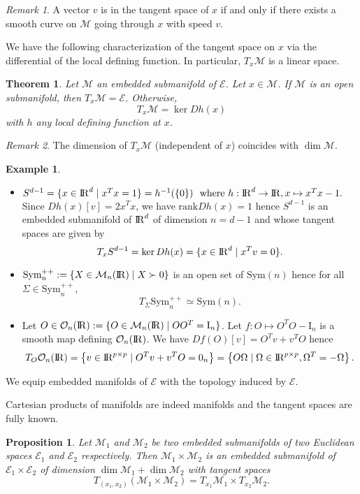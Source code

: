 \documentclass[10pt,a4paper]{book}
\theoremstyle{definition}
\newtheorem{exm}{Example}[section]
\theoremstyle{plain}
\newtheorem{thm}{Theorem}[section]
\newtheorem{prop}{Proposition}[section]
\theoremstyle{remark}
\newtheorem{rmk}{Remark}[section]
\newcommand{\E}{\mathcal{E}}
\newcommand \M {\mathcal{M}}
\def\R{{\rm I\kern-0.16em R}}
\begin{document}
\begin{rmk}
A vector $v$ is in the tangent space of $x$ if and only if there exists a smooth curve on $\mathcal{M}$ going through $x$ with speed $v$.
\end{rmk}
We have the following characterization of the tangent space on $x$ via the differential of the local defining function. In particular, $T_x\M$ is a linear space.
\begin{thm}
Let $\mathcal{M}$ an embedded submanifold of $\mathcal{E}$. Let $x\in \mathcal{M}$. If $\mathcal{M}$ is an open submanifold, then $T_x\mathcal{M}=\mathcal{E}$. Otherwise,
$$T_x\mathcal{M}=\ker Dh(x)$$
with $h$ any local defining function at $x$.
\end{thm}
\begin{rmk} The dimension of $T_x\mathcal{M}$ (independent of $x$) coincides with $\dim \mathcal{M}$.
\end{rmk}
\begin{exm}~
\begin{itemize}
\item $S^{d-1}=\{x\in \R^d\mid x^{T}x=1\}= h^{-1}(\{0\})~\text{ where }h:\R^d\to \R, x\mapsto x^{T}x-1.$
Since $Dh(x)[v]=2x^{T}x$, we have $\text{rank} Dh(x)=1$ hence $S^{d-1}$ is an embedded submanifold of $\R^d$ of dimension $n=d-1$ and whose tangent spaces are given by
$$T_xS^{d-1}=\ker Dh(x)=\{x\in \R^{d}\mid x^{T}v=0\}.$$
\item $\text{Sym}_n^{++}:=\{X\in \mathcal{M}_n(\R) \mid X \succ 0\}$ is an open set of $\text{Sym}(n)$ hence for all $\Sigma \in \text{Sym}_{n}^{++}$,
$$T_{\Sigma}\text{Sym}_n^{++}\simeq \text{Sym}(n).$$
\item Let $O \in \mathcal{O}_n(\R):=\{O \in \mathcal{M}_n(\R) \mid OO^{T}=\text{I}_n\}$. Let $f:O\mapsto O^TO -\text{I}_n$ is a smooth map defining $\mathcal{O}_n(\R)$. We have
$Df(O)[v]=O^Tv+v^{T}O$ hence
$$T_O\mathcal{O}_n(\R) =\left\{v\in \R^{p\times p} \mid O^Tv+v^TO=0_{n}\right\}=\left\{O\Omega \mid \Omega \in \R^{p\times p}, \Omega^{T}=-\Omega\right\}.$$
\end{itemize}
\end{exm}
We equip embedded manifolds of $\mathcal{E}$ with the topology induced by $\mathcal{E}$. 

Cartesian products of manifolds are indeed manifolds and the tangent spaces are fully known.
\begin{prop}
Let $\M_1$ and $\M_2$ be two embedded submanifolds of two Euclidean spaces $\E_1$ and $\E_2$ respectively. Then $\M_1\times \M_2$ is an embedded submanifold of $\E_1\times \E_2$ of dimension $\dim \M_1+\dim\M_2$ with tangent spaces
$$T_{(x_1,x_2)}(\M_1\times \M_2)=T_{x_1}\M_1\times T_{x_2}\M_2.$$
\end{prop}
\end{document}
